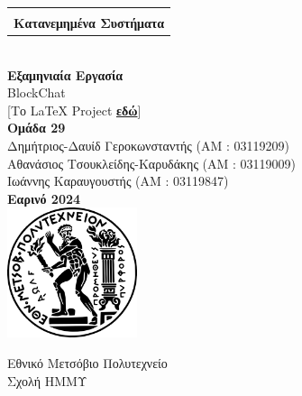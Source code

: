 \documentclass[12pt, a4paper]{article}
\begin{document}
	
	
	\thispagestyle{empty}
	
	\begin{center}
		
		
		\begin{tabular}{c}
			\hline \\
			\Huge \textbf{Κατανεμημένα Συστήματα}\\[0.5em]
			\hline
		\end{tabular}\\[5em]
		
		
		
		\LARGE \textbf{Εξαμηνιαία Εργασία} \\[0.5em]
		\Large BlockChat \\[1em]
	
		
		\small [Το \foreignlanguage{english}{\LaTeX} Project
		\href{https://www.dropbox.com/scl/fi/jr7wfars2906nf6gk16gz/reportDistributedSystems.zip?rlkey=78r426g8wb01vbl8f1m0rhvgi&dl=0}{\color{purple} \textbf{εδώ}}] \\[7em]
		
		\Large \textbf{Ομάδα 29}\\[0.3em]
		\large Δημήτριος-Δαυίδ Γεροκωνσταντής (ΑΜ : 03119209)\\
		\large Αθανάσιος Τσουκλείδης-Καρυδάκης (ΑΜ : 03119009)\\
		\large Ιωάννης Καραυγουστής (ΑΜ : 03119847)\\[7em]
		\large
		\textbf{Εαρινό 2024}\\[3.1em]
		
		\includegraphics[width=1.5in]{NTUA}\\[1em]
		\large
		
		Εθνικό Μετσόβιο Πολυτεχνείο\\
		Σχολή ΗΜΜΥ
	\end{center}
	
	\begingroup
	\let\cleardoublepage\clearpage
	\tableofcontents
	\endgroup
	\newpage
	
\end{document}
